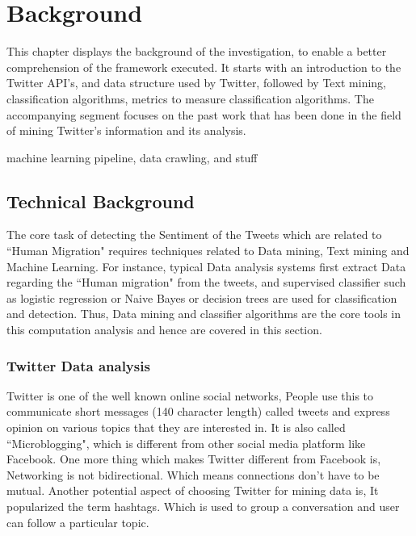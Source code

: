 \chapter{Background}\label{chap:background}
This chapter displays the background of the investigation, to enable a better comprehension of the framework executed. It starts with an introduction to the Twitter API's, and data structure used by Twitter, followed by Text mining, classification algorithms, metrics to measure classification algorithms. The accompanying segment focuses on the past work that has been done in the field of mining Twitter's information and its analysis.

machine learning pipeline, data crawling, and stuff
    
\section{Technical Background}

The core task of detecting the Sentiment of the Tweets which are related to ``Human Migration" requires techniques related to Data mining, Text mining and Machine Learning. For instance, typical Data analysis systems first extract Data regarding the ``Human migration" from the tweets, and supervised classifier such as logistic regression or Naive Bayes or decision trees are used for classification and detection. Thus, Data mining and classifier algorithms are the core tools in this computation analysis and hence are covered in this section.

\subsection{Twitter Data analysis}

Twitter is one of the well known online social networks, People use this to communicate short messages (140 character length) called tweets and express opinion on various topics that they are interested in. It is also called ``Microblogging", which is different from other social media platform like Facebook. One more thing which makes Twitter different from Facebook is, Networking is not bidirectional. Which means connections don't have to be mutual. Another potential aspect of choosing Twitter for mining data is, It popularized the term hashtags. Which is used to group a  conversation and user can follow a particular topic.

